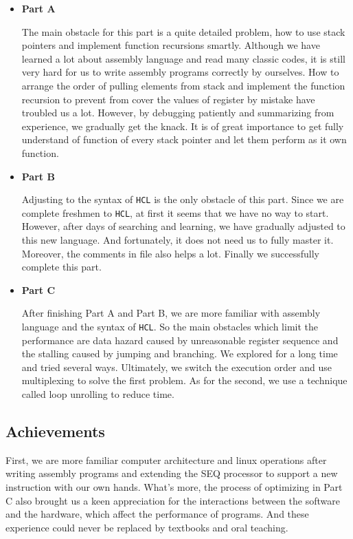 \documentclass{article}
\begin{document}
\begin{itemize}
	\item \textbf{Part A}
	
		The main obstacle for this part is a quite detailed problem, how to use stack pointers and implement function recursions smartly. Although we have learned a lot about assembly language and read many classic codes, it is still very hard for us to write assembly programs correctly by ourselves. How to arrange the order of pulling elements from stack and implement the function recursion to prevent from cover the values of register by mistake have troubled us a lot. However, by debugging patiently and summarizing from experience, we gradually get the knack. It is of great importance to get fully understand of function of every stack pointer and let them perform as it own function.
		
	\item \textbf{Part B}
	
		Adjusting to the syntax of \texttt{HCL} is the only obstacle of this part. Since we are complete freshmen to \texttt{HCL}, at first it seems that we have no way to start. However, after days of searching and learning, we have gradually adjusted to this new language. And fortunately, it does not need us to fully master it. Moreover, the comments in file also helps a lot. Finally we successfully complete this part.
	\item \textbf{Part C}
	
		After finishing Part A and Part B, we are more familiar with assembly language and the syntax of \texttt{HCL}. So the main obstacles which limit the performance are data hazard caused by unreasonable register sequence and the stalling caused by jumping and branching. We explored for a long time and tried several ways. Ultimately, we switch the execution order and use multiplexing to solve the first problem. As for the second, we use a technique called loop unrolling to reduce time.
\end{itemize}

\subsection{Achievements}
First, we are more familiar computer architecture and linux operations after writing assembly programs and extending the SEQ processor to support a new instruction with our own hands. What's more, the process of optimizing in Part C also brought us a keen appreciation for the interactions between the software and the hardware, which affect the performance of programs. And these experience could never be replaced by textbooks and oral teaching.
\end{document}

